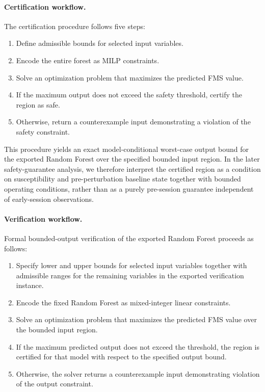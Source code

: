 \documentclass[review]{vgtc}              %
\begin{document}
\paragraph{Certification workflow.}
The certification procedure follows five steps:
\begin{enumerate}[leftmargin=*, nosep]
    \item Define admissible bounds for selected input variables.
    \item Encode the entire forest as MILP constraints.
    \item Solve an optimization problem that maximizes the predicted FMS value.
    \item If the maximum output does not exceed the safety threshold, certify the region as safe.
    \item Otherwise, return a counterexample input demonstrating a violation of the safety constraint.
\end{enumerate}
This procedure yields an exact model-conditional worst-case output bound for the exported Random Forest over the specified bounded input region. In the later safety-guarantee analysis, we therefore interpret the certified region as a condition on susceptibility and pre-perturbation baseline state together with bounded operating conditions, rather than as a purely pre-session guarantee independent of early-session observations.


\paragraph{Verification workflow.}
Formal bounded-output verification of the exported Random Forest proceeds as follows:
\begin{enumerate}
\item Specify lower and upper bounds for selected input variables together with admissible ranges for the remaining variables in the exported verification instance.
\item Encode the fixed Random Forest as mixed-integer linear constraints.
\item Solve an optimization problem that maximizes the predicted FMS value over the bounded input region.
\item If the maximum predicted output does not exceed the threshold, the region is certified for that model with respect to the specified output bound.
\item Otherwise, the solver returns a counterexample input demonstrating violation of the output constraint.
\end{enumerate}
\end{document}
